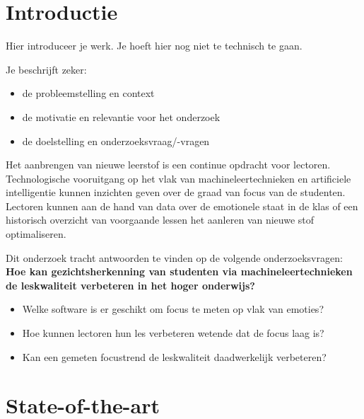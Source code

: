 
\section{Introductie} %
\label{sec:introductie}

Hier introduceer je werk. Je hoeft hier nog niet te technisch te gaan.

Je beschrijft zeker:

\begin{itemize}
  \item de probleemstelling en context
  \item de motivatie en relevantie voor het onderzoek
  \item de doelstelling en onderzoeksvraag/-vragen
\end{itemize}

Het aanbrengen van nieuwe leerstof is een continue opdracht voor lectoren. Technologische vooruitgang op het vlak van machineleertechnieken en artificiele intelligentie kunnen inzichten geven over de graad van focus van de studenten. Lectoren kunnen aan de hand van data over de emotionele staat in de klas of een historisch overzicht van voorgaande lessen het aanleren van nieuwe stof optimaliseren. 

Dit onderzoek tracht antwoorden te vinden op de volgende onderzoeksvragen: 
\textbf{Hoe kan gezichtsherkenning van studenten via machineleertechnieken de leskwaliteit verbeteren in het hoger onderwijs?}
\begin{itemize}
    \item Welke software is er geschikt om focus te meten op vlak van emoties?
    \item Hoe kunnen lectoren hun les verbeteren wetende dat de focus laag is?
    \item Kan een gemeten focustrend de leskwaliteit daadwerkelijk verbeteren?
\end{itemize}


\section{State-of-the-art}
\label{sec:state-of-the-art}

